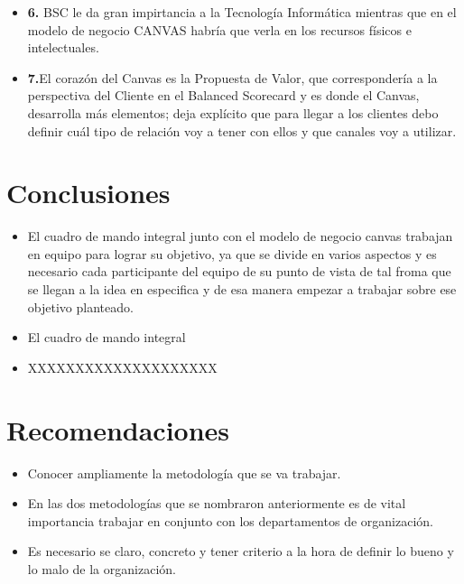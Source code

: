 \documentclass[preprint,12pt]{elsarticle}
\begin{document}
\begin{itemize}
	\item{\textbf{6.}} BSC le da gran impirtancia a la Tecnología Informática mientras que en el modelo de negocio CANVAS habría que verla en los recursos físicos e intelectuales.
	\item{\textbf{7.}}El corazón del Canvas es la Propuesta de Valor, que correspondería a la perspectiva del Cliente en el Balanced Scorecard y es donde el Canvas, desarrolla más elementos; deja explícito que para llegar a los clientes debo definir cuál tipo de relación voy a tener con ellos y que canales voy a utilizar.
	\end{itemize}


\section{Conclusiones}

	\begin{itemize}
		\item El cuadro de mando integral junto con el modelo de negocio canvas trabajan en equipo para lograr su objetivo, ya que se divide en varios aspectos y es necesario cada participante del equipo de su punto de vista de tal froma que se llegan a la  idea en especifica y de esa manera empezar a trabajar sobre ese objetivo planteado.
		\item El cuadro de mando integral 
		\item XXXXXXXXXXXXXXXXXXXX
	\end{itemize}


\section{Recomendaciones}	

	\begin{itemize}
		\item Conocer ampliamente la metodología que se va trabajar.
		\item En las dos metodologías que se nombraron anteriormente es de vital importancia trabajar en conjunto con los departamentos de organización.
		\item Es necesario se claro, concreto y tener criterio a la hora de definir lo bueno y lo malo de la organización.
	\end{itemize}



	
	\newpage
	
		
\end{document}
